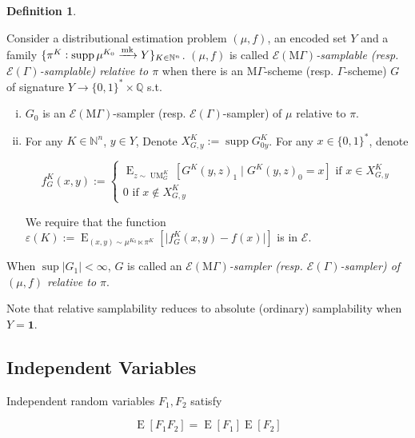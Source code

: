 \documentclass{article}
\numberwithin{equation}{section}
\theoremstyle{definition}
\newtheorem{definition}{Definition}[section]
\theoremstyle{plain}
\newcommand{\Bool}{\{0,1\}}
\newcommand{\Words}{{\Bool^*}}
\DeclareMathOperator{\Supp}{supp}
\DeclareMathOperator{\E}{E}
\DeclareMathOperator{\UM}{UM}
\newcommand{\Nats}{\mathbb{N}}
\newcommand{\Rats}{\mathbb{Q}}
\newcommand{\Abs}[1]{\lvert #1 \rvert}
\newcommand{\MGrow}{\mathrm{M}\Gamma}
\newcommand{\Fall}{\mathcal{E}}
\newcommand{\EG}{\Fall(\Gamma)}
\newcommand{\EMG}{\Fall(\MGrow)}
\newcommand{\Markov}{\xrightarrow{\textnormal{mk}}}
\begin{document}
\begin{samepage}
\begin{definition}
\label{def:gen_rel}

Consider a distributional estimation problem $(\mu,f)$, an encoded set $Y$ and a family $\{\pi^K: \Supp \mu^{K_0} \Markov Y\}_{K \in \Nats^n}$. $(\mu,f)$ is called \emph{$\EMG$-samplable (resp. $\EG$-samplable) relative to $\pi$} when there is an $\MGrow$-scheme (resp. $\Gamma$-scheme) $G$ of signature $Y \rightarrow \Words \times \Rats$ s.t.

\begin{enumerate}[(i)]

\item $G_0$ is an $\EMG$-sampler (resp. $\EG$-sampler) of $\mu$ relative to $\pi$.

\item For any $K \in \Nats^n$, $y \in Y$, Denote $X_{G,y}^K:=\Supp G_{0y}^K$. For any ${x \in \Words}$, denote 

$$f_G^K(x,y):=\begin{cases}\E_{z \sim\UM_G^K}[G^K(y,z)_1 \mid G^K(y,z)_0 = x] \text{ if } x \in X_{G,y}^K \\ 0 \text{ if } x \not\in X_{G,y}^K \end{cases}$$

We require that the function ${\varepsilon(K):=\E_{(x,y) \sim \mu^{K_0} \ltimes \pi^K}[\Abs{f_G^K(x,y)-f(x)}]}$ is in $\Fall$.

\end{enumerate}

When $\sup{\Abs{G_1}} < \infty$, $G$ is called an \emph{$\EMG$-sampler (resp. $\EG$-sampler) of $(\mu,f)$ relative to $\pi$}.

\end{definition}
\end{samepage}

Note that relative samplability reduces to absolute (ordinary) samplability when $Y=\bm{1}$.

\subsection{Independent Variables}
\label{subsec:indep_var}

Independent random variables $F_1, F_2$ satisfy 

\begin{equation}
\label{eqn:ev_mult}
\E[F_1 F_2] = \E[F_1] \E[F_2]
\end{equation}
\end{document}
